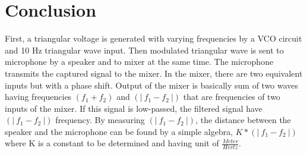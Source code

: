 \documentclass[paper]{IEEEtran}
\begin{document}
\vfill

\section{Conclusion}

	First, a triangular voltage is generated with varying frequencies by a VCO circuit and 10 Hz triangular wave input. Then modulated triangular wave is sent to microphone by a speaker and to mixer at the same time. The microphone transmits the captured signal to the mixer. In the mixer, there are two equivalent inputs but with a phase shift. Output of the mixer is basically sum of two waves having frequencies $ (f_1+f_2)$ and $(|~f_1 -f_2~|) $ that are frequencies of two inputs of the mixer. If this signal is low-passed, the filtered signal have $(|~f_1 -f_2~|) $ frequency. By measuring $(|~f_1 -f_2~|) $, the distance between the speaker and the microphone can be found by a simple algebra, $K*(|~f_1 -f_2~|) $ where K is a constant to be determined and having unit of $\frac{Meter}{Hertz} $.

 


\end{document}
